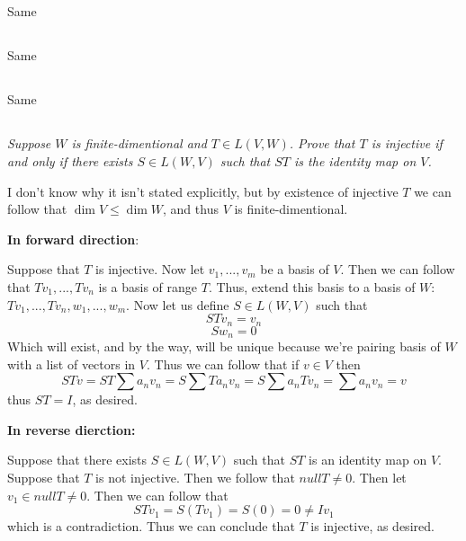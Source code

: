 \documentclass[11pt,oneside,titlepage]{book}
\begin{document}
\subsection{}

Same

\subsection{}

Same

\subsection{}

Same

\subsection{}

\textit{Suppose $W$ is finite-dimentional and $T \in L(V, W)$. Prove that $T$ is injective
  if and only if there exists $S \in L(W, V)$ such that $ST$ is the identity map on $V$.}

I don't know why it isn't stated explicitly, but by existence of injective $T$ we can
follow that $\dim V \leq \dim W$, and thus $V$ is finite-dimentional.

\textbf{In forward  direction}:

Suppose that $T$ is injective. Now let $v_1, ..., v_m$ be a basis of $V$. Then we can follow
that $Tv_1, ..., Tv_n$ is a basis of range $T$. Thus, extend this basis to a basis of $W$:
$Tv_1, ..., Tv_n, w_1, ..., w_m$. Now let us define $S \in L(W, V)$ such that
$$S Tv_n = v_n$$ 
$$S w_n = 0$$
Which will exist, and by the way, will be unique
because we're pairing basis of $W$ with a list of vectors in $V$. Thus we
can follow that if $v \in V$ then
$$ST v = ST \sum a_n v_n = S \sum T a_n v_n = S \sum a_n T  v_n = \sum a_n v_n = v$$
thus $ST = I$, as desired.

\textbf{In reverse dierction: }

Suppose that there exists $S \in L(W, V)$ such that $ST$ is an identity map on $V$. Suppose that
$T$ is not injective.  Then we follow that $null T \neq 0$.
Then let $v_1 \in null T \neq 0$. Then we can follow that
$$ST v_1 = S(T v_1) = S(0) = 0 \neq Iv_1$$
which is a contradiction. Thus we can conclude that $T$ is injective, as desired.

\subsection{}
\end{document}
